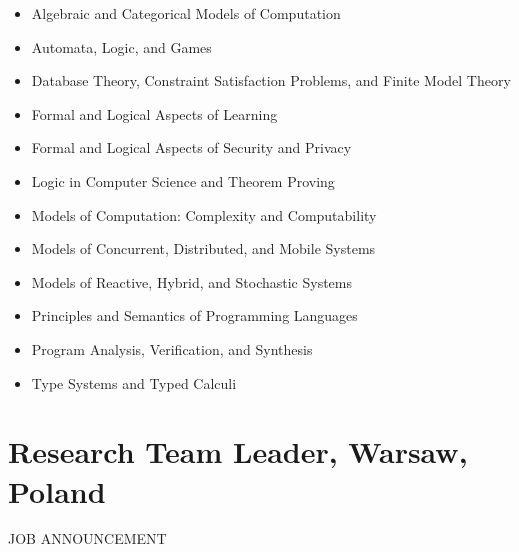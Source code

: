 \documentclass[prodmode,acmtecs]{acmsmall} %
\begin{document}
\begin{itemize}
\begin{itemize}\item  Algebraic and Categorical Models of Computation
\item  Automata, Logic, and Games
\item  Database Theory, Constraint Satisfaction Problems, and Finite Model Theory
\item  Formal and Logical Aspects of Learning
\item  Formal and Logical Aspects of Security and Privacy
\item  Logic in Computer Science and Theorem Proving
\item  Models of Computation: Complexity and Computability
\item  Models of Concurrent, Distributed, and Mobile Systems
\item  Models of Reactive, Hybrid, and Stochastic Systems
\item  Principles and Semantics of Programming Languages
\item  Program Analysis, Verification, and Synthesis
\item  Type Systems and Typed Calculi
\end{itemize} 
\end{itemize}\section{Research Team Leader, Warsaw, Poland}\label{ResearchTeamLeaderWarsawPoland}JOB ANNOUNCEMENT 
\end{document}
